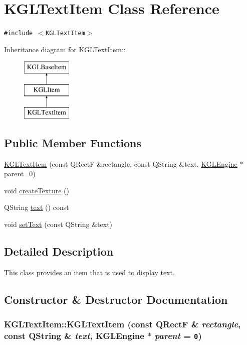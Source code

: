 \hypertarget{class_k_g_l_text_item}{
\section{KGLTextItem Class Reference}
\label{class_k_g_l_text_item}
}
{\tt \#include $<$KGLTextItem$>$}

Inheritance diagram for KGLTextItem::\begin{figure}[H]
\begin{center}
\leavevmode
\includegraphics[height=3cm]{class_k_g_l_text_item}
\end{center}
\end{figure}
\subsection*{Public Member Functions}
\begin{CompactItemize}
\item 
\hyperlink{class_k_g_l_text_item_cad71e3ee962c1fdeb5378dc3c4fa0fd}{KGLTextItem} (const QRectF \&rectangle, const QString \&text, \hyperlink{class_k_g_l_engine}{KGLEngine} $\ast$parent=0)
\item 
void \hyperlink{class_k_g_l_text_item_330ab08d8e04a30433439ef60ce82537}{createTexture} ()
\item 
QString \hyperlink{class_k_g_l_text_item_e747fea09561a8d87b464bd304eb8f9c}{text} () const 
\item 
void \hyperlink{class_k_g_l_text_item_7977d97cfd7480c0d5915803e259719c}{setText} (const QString \&text)
\end{CompactItemize}


\subsection{Detailed Description}
This class provides an item that is used to display text. 

\subsection{Constructor \& Destructor Documentation}
\hypertarget{class_k_g_l_text_item_cad71e3ee962c1fdeb5378dc3c4fa0fd}{
\subsubsection[{KGLTextItem}]{\setlength{\rightskip}{0pt plus 5cm}KGLTextItem::KGLTextItem (const QRectF \& {\em rectangle}, \/  const QString \& {\em text}, \/  {\bf KGLEngine} $\ast$ {\em parent} = {\tt 0})}}
\label{class_k_g_l_text_item_cad71e3ee962c1fdeb5378dc3c4fa0fd}




